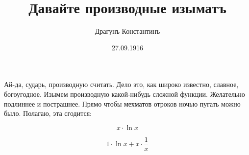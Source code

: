 \documentclass[12pt,a4paper]{article}
\author{Драгунъ Константинъ}
\title{Давайте производные изыматъ}
\date{27.09.1916}
\begin{document}
\maketitle
Ай-да, сударь, производную считать. Дело это, как широко известно, славное, богоугодное. Изымем производную какой-нибудь сложной функции.
Желательно подлиннее и пострашнее. Прямо чтобы \sout{мехматов} отроков ночью пугать можно было. 
Полагаю, эта сгодится: 

$$x\cdot\ln{x}$$

$$1\cdot\ln{x}+x\cdot\frac{1}{x}$$
\end{document}
